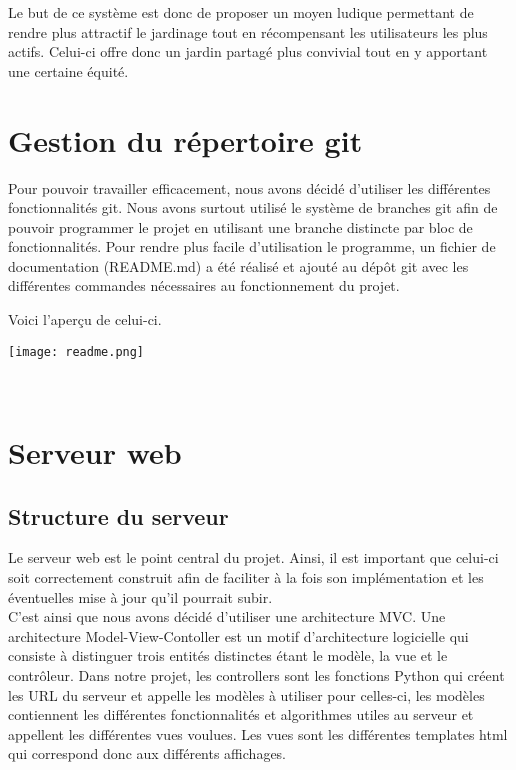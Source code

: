 \documentclass[12pt,titlepage]{report}
\begin{document}
Le but de ce système est donc de proposer un moyen ludique permettant de rendre plus attractif le jardinage tout en récompensant les utilisateurs les plus actifs. Celui-ci offre donc un jardin partagé plus convivial tout en y apportant une certaine équité. 


\chapter{Gestion du répertoire git}

Pour pouvoir travailler efficacement, nous avons décidé d’utiliser les différentes fonctionnalités git.
Nous avons surtout utilisé le système de branches git afin de pouvoir programmer le projet en utilisant une branche distincte par bloc de fonctionnalités. Pour rendre plus facile d’utilisation le programme, un fichier de documentation (README.md) a été réalisé et ajouté au dépôt git avec les différentes commandes nécessaires au fonctionnement du projet. 

Voici l'aperçu de celui-ci.

\begin{center}
    \texttt{[image: readme.png]} 
\end{center}
\\[0.6cm]

\chapter{Serveur web}

\section{Structure du serveur}
Le serveur web est le point central du projet. Ainsi, il est important que celui-ci soit correctement construit afin de faciliter à la fois son implémentation et les éventuelles mise à jour qu’il pourrait subir. \\

C’est ainsi que nous avons décidé d’utiliser une architecture MVC. Une architecture Model-View-Contoller est un motif d'architecture logicielle qui consiste à distinguer trois entités distinctes étant le modèle, la vue et le contrôleur.
Dans notre projet, les controllers sont les fonctions Python qui créent les URL du serveur et appelle les modèles à utiliser pour celles-ci, les modèles contiennent les différentes fonctionnalités et algorithmes utiles au serveur et appellent les différentes vues voulues. 
Les vues sont les différentes templates html qui correspond donc aux différents affichages. \\
\end{document}
